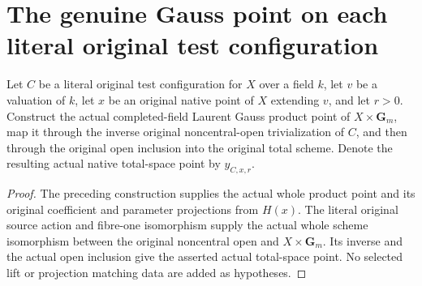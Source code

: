 \section{The genuine Gauss point on each literal original test configuration}

\begin{definition}\label{def:native-test-configuration-gauss-point}
\leanok
Let $C$ be a literal original test configuration for $X$ over a field $k$,
let $v$ be a valuation of $k$, let $x$ be an original native point of $X$
extending $v$, and let $r>0$. Construct the actual completed-field Laurent
Gauss product point of $X\times\mathbf G_m$, map it through the inverse
original noncentral-open trivialization of $C$, and then through the
original open inclusion into the original total scheme. Denote the
resulting actual native total-space point by $y_{C,x,r}$.
\end{definition}
\begin{proof}
The preceding construction supplies the actual whole product point and
its original coefficient and parameter projections from $H(x)$.
The literal original source action and fibre-one isomorphism supply the
actual whole scheme isomorphism between the original noncentral open
and $X\times\mathbf G_m$. Its inverse and the actual open inclusion give
the asserted actual total-space point. No selected lift or projection
matching data are added as hypotheses.
\end{proof}

